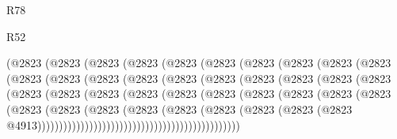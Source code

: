 \begin{lexlean}{R78}
\begin{lexlean}{R52}
\begin{coremodule}
{{{{{{{{{{{{{{{{{{{{{{{{{{{{{{{{{{{{{{{{{{{{{{{{{{{{{{{{{{{{{{{{{{{{{{{{{{{{{{{{{{{{{{{{{{{{{{{{{{{{{{{{{{{{{{{{{{{{{{{{{{{{{{{{{{{{{{{{{{{{{{{{{{{{{{{{{{{{{{{{{{{{{{{{{{{{{{{{{{{{{{{{{{{{{{{{{{{{{{                    (@2823
                      (@2823
                        (@2823
                          (@2823
                            (@2823
                              (@2823
                                (@2823
                                  (@2823
                                    (@2823
                                      (@2823
                                        (@2823
                                          (@2823
                                            (@2823
                                              (@2823
                                                (@2823
                                                  (@2823
                                                    (@2823
                                                      (@2823
                                                        (@2823
                                                          (@2823
                                                            (@2823
                                                              (@2823
                                                                (@2823
                                                                  (@2823
                                                                    (@2823
                                                                      (@2823
                                                                        (@2823
                                                                          (@2823
                                                                            (@2823
                                                                              (@2823
                                                                                (@2823
                                                                                  (@2823
                                                                                    (@2823
                                                                                      (@2823
                                                                                        (@2823
                                                                                          (@2823
                                                                                            (@2823
                                                                                              (@2823
                                                                                                (@2823
                                                                                                  @4913)))))))))))))))))))))))))))))))))))))))))))))))
}}}}}}}}}}}}}}}}}}}}}}}}}}}}}}}}}}}}}}}}}}}}}}}}}}}}}}}}}}}}}}}}}}}}}}}}}}}}}}}}}}}}}}}}}}}}}}}}}}}}}}}}}}}}}}}}}}}}}}}}}}}}}}}}}}}}}}}}}}}}}}}}}}}}}}}}}}}}}}}}}}}}}}}}}}}}}}}}}}}}}}}}}}}}}}}}}}}}}}
\end{coremodule}
\end{lexlean}
\end{lexlean}
